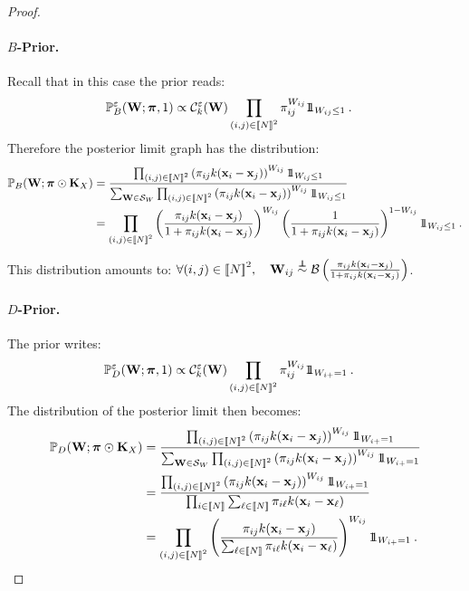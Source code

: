 \begin{proof}
\paragraph{$B$-Prior.}
Recall that in this case the prior reads:
\begin{align*}
    \mathbb{P}_{B}^{\varepsilon}({\mathbf{W}}; \bm{\pi},1) &\propto \mathcal{C}_{k}^{\varepsilon}({\mathbf{W}}) \prod_{(i,j) \in {[\![N]\!]}^2} \pi_{ij}^{W_{ij}} 1\!\!1_{W_{ij} \leq 1} \:.
\end{align*}
Therefore the posterior limit graph has the distribution:
\begin{align*}
    \mathbb{P}_{B}(\W ;\bm{\pi} \odot \mK_{X})
    &= \frac{\prod_{(i,j) \in \integ{N}^2}  \left(\pi_{ij} k(\mathbf{x}_i - \mathbf{x}_j)\right)^{W_{ij}} \ind_{W_{ij} \leq 1}}{\sum_{\W \in \mathcal{S}_{W}} \prod_{(i,j) \in \integ{N}^2}  \left(\pi_{ij} k(\mathbf{x}_i - \mathbf{x}_j)\right)^{W_{ij}} \ind_{W_{ij} \leq 1}} \\
    &= \prod_{(i,j) \in \integ{N}^2}  \left(\frac{\pi_{ij} k(\mathbf{x}_i - \mathbf{x}_j)}{1+\pi_{ij} k(\mathbf{x}_i - \mathbf{x}_j)}\right)^{W_{ij}} \left(\frac{1}{1+\pi_{ij} k(\mathbf{x}_i - \mathbf{x}_j)}\right)^{1-W_{ij}} \ind_{W_{ij} \leq 1} \:.
\end{align*}

This distribution amounts to: $\forall (i,j) \in {[\![N]\!]}^2, \quad \mathbf{W}_{ij} \stackrel{\perp\!\!\!\!\perp}{\sim} \mathcal{B}\left( \frac{\pi_{ij} k(\mathbf{x}_i - \mathbf{x}_j)}{1+\pi_{ij} k(\mathbf{x}_i - \mathbf{x}_j)} \right)$.

\paragraph{$D$-Prior.} The prior writes:
\begin{align*}
    \mathbb{P}_{D}^{\varepsilon}({\mathbf{W}}; \bm{\pi}, 1) &\propto \mathcal{C}_{k}^{\varepsilon}({\mathbf{W}}) \prod_{(i,j) \in {[\![N]\!]}^2} \pi_{ij}^{W_{ij}} 1\!\!1_{W_{i+} = 1} \:.
\end{align*}
The distribution of the posterior limit then becomes:
\begin{align*}
    \mathbb{P}_{D}(\W ;\bm{\pi} \odot \mK_{X}) &= \frac{\prod_{(i,j) \in \integ{N}^2}  \left(\pi_{ij} k(\mathbf{x}_i - \mathbf{x}_j)\right)^{W_{ij}} \ind_{W_{i+} = 1}}{\sum_{\W \in \mathcal{S}_{W}} \prod_{(i,j) \in \integ{N}^2}  \left(\pi_{ij} k(\mathbf{x}_i - \mathbf{x}_j)\right)^{W_{ij}} \ind_{W_{i+} = 1}} \\
    &= \frac{\prod_{(i,j) \in \integ{N}^2}  \left(\pi_{ij} k(\mathbf{x}_i - \mathbf{x}_j)\right)^{W_{ij}} \ind_{W_{i+} = 1}}{\prod_{i \in \integ{N}} \sum_{\ell \in \integ{N}} \pi_{i\ell} k(\mathbf{x}_i - \mathbf{x}_{\ell})} \\
    &= \prod_{(i,j) \in \integ{N}^2} \left(\frac{\pi_{ij} k(\mathbf{x}_i - \mathbf{x}_j)}{\sum_{\ell \in \integ{N}} \pi_{i\ell} k(\mathbf{x}_i - \mathbf{x}_{\ell})}\right)^{W_{ij}} \ind_{W_{i+} = 1} \:.
\end{align*}


\end{proof}
